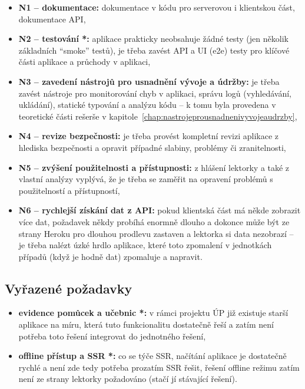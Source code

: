 \begin{itemize}
    \item \textbf{N1 -- dokumentace:} dokumentace v kódu pro serverovou i klientskou část, dokumentace API,
    \item \textbf{N2 -- testování *:} aplikace prakticky neobsahuje žádné testy (jen několik základních \enquote{smoke} testů), je třeba zavést API a UI (e2e) testy pro klíčové části aplikace a průchody v aplikaci,
    \item \textbf{N3 -- zavedení nástrojů pro usnadnění vývoje a údržby:} je třeba zavést nástroje pro monitorování chyb v aplikaci, správu logů (vyhledávání, ukládání), statické typování a analýzu kódu -- k tomu byla provedena v teoretické části rešerše v kapitole~\ref{chap:nastrojeprousnadnenivyvojeaudrzby},
    \item \textbf{N4 -- revize bezpečnosti:} je třeba provést kompletní revizi aplikace z hlediska bezpečnosti a opravit případné slabiny, problémy či zranitelnosti,
    \item \textbf{N5 -- zvýšení použitelnosti a přístupnosti:} z hlášení lektorky a také z vlastní analýzy vyplývá, že je třeba se zaměřit na opravení problémů s použitelností a přístupností,
    \item \textbf{N6 -- rychlejší získání dat z API:} pokud klientská část má někde zobrazit více dat, požadavek někdy probíhá enormně dlouho a dokonce může být ze strany Heroku pro dlouhou prodlevu zastaven a lektorka si data nezobrazí -- je třeba nalézt úzké hrdlo aplikace, které toto zpomalení v jednotkách případů (když je hodně dat) zpomaluje a napravit.
\end{itemize}


\subsection{Vyřazené požadavky}\label{subsec:vyrazenepozadavky}
\begin{itemize}
    \item \textbf{evidence pomůcek a učebnic *:} v rámci projektu ÚP již existuje starší aplikace na míru, která tuto funkcionalitu dostatečně řeší a zatím není potřeba toto řešení integrovat do jednotného řešení,
    \item \textbf{offline přístup a SSR *:} co se týče SSR, načítání aplikace je dostatečně rychlé a není zde tedy potřeba prozatím SSR řešit, řešení offline režimu zatím není ze strany lektorky požadováno (stačí jí stávající řešení).
\end{itemize}


